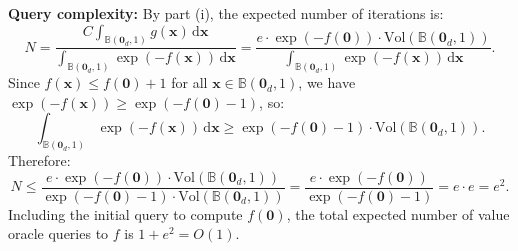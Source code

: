 \textbf{Query complexity:} By part (i), the expected number of iterations is:
\[
N = \frac{C \int_{\mathbb{B}(\mathbf{0}_d,1)} g(\mathbf{x})\,\mathrm{d}\mathbf{x}}{\int_{\mathbb{B}(\mathbf{0}_d,1)} \exp(-f(\mathbf{x}))\,\mathrm{d}\mathbf{x}} = \frac{e \cdot \exp(-f(\mathbf{0})) \cdot \mathrm{Vol}(\mathbb{B}(\mathbf{0}_d,1))}{\int_{\mathbb{B}(\mathbf{0}_d,1)} \exp(-f(\mathbf{x}))\,\mathrm{d}\mathbf{x}}.
\]
Since $f(\mathbf{x}) \leq f(\mathbf{0}) + 1$ for all $\mathbf{x} \in \mathbb{B}(\mathbf{0}_d,1)$, we have $\exp(-f(\mathbf{x})) \geq \exp(-f(\mathbf{0}) - 1)$, so:
\[
\int_{\mathbb{B}(\mathbf{0}_d,1)} \exp(-f(\mathbf{x}))\,\mathrm{d}\mathbf{x} \geq \exp(-f(\mathbf{0}) - 1) \cdot \mathrm{Vol}(\mathbb{B}(\mathbf{0}_d,1)).
\]
Therefore:
\[
N \leq \frac{e \cdot \exp(-f(\mathbf{0})) \cdot \mathrm{Vol}(\mathbb{B}(\mathbf{0}_d,1))}{\exp(-f(\mathbf{0}) - 1) \cdot \mathrm{Vol}(\mathbb{B}(\mathbf{0}_d,1))} = \frac{e \cdot \exp(-f(\mathbf{0}))}{\exp(-f(\mathbf{0}) - 1)} = e \cdot e = e^2.
\]
Including the initial query to compute $f(\mathbf{0})$, the total expected number of value oracle queries to $f$ is $1 + e^2 = O(1)$.
